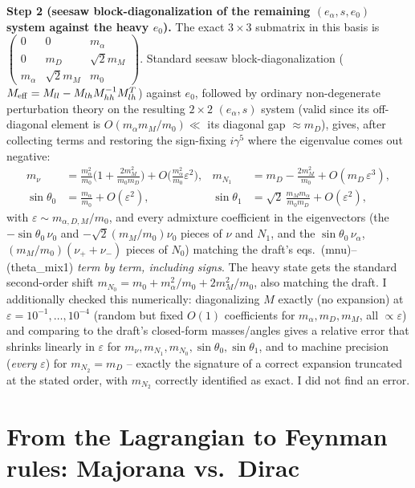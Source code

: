 \documentclass[11pt,a4paper]{article}
\begin{document}
\textbf{Step 2 (seesaw block-diagonalization of the remaining
$(e_\alpha,s,e_0)$ system against the heavy $e_0$).} The exact $3\times3$
submatrix in this basis is $\begin{pmatrix}0&0&m_\alpha\\0&m_D&\sqrt2
m_M\\m_\alpha&\sqrt2m_M&m_0\end{pmatrix}$. Standard seesaw
block-diagonalization ($M_{\rm eff}=M_{ll}-M_{lh}M_{hh}^{-1}M_{lh}^T$) against
$e_0$, followed by ordinary non-degenerate perturbation theory on the
resulting $2\times2$ $(e_\alpha,s)$ system (valid since its off-diagonal
element is $O(m_\alpha m_M/m_0)\ll$ its diagonal gap $\approx m_D$), gives,
after collecting terms and restoring the sign-fixing $i\gamma^5$ where the
eigenvalue comes out negative:
\begin{align}
  m_\nu &= \frac{m_\alpha^2}{m_0}\Big(1+\frac{2m_M^2}{m_0m_D}\Big)
    + O\Big(\frac{m_\alpha^2}{m_0}\varepsilon^2\Big), &
  m_{N_1} &= m_D - \frac{2m_M^2}{m_0} + O(m_D\,\varepsilon^3), \\
  \sin\theta_0 &= \frac{m_\alpha}{m_0}+O(\varepsilon^2), &
  \sin\theta_1 &= \sqrt2\,\frac{m_Mm_\alpha}{m_0m_D}+O(\varepsilon^2),
\end{align}
with $\varepsilon\sim m_{\alpha,D,M}/m_0$, and every admixture coefficient in
the eigenvectors (the $-\sin\theta_0\,\nu_0$ and $-\sqrt2(m_M/m_0)\nu_0$
pieces of $\nu$ and $N_1$, and the $\sin\theta_0\,\nu_\alpha$,
$(m_M/m_0)(\nu_++\nu_-)$ pieces of $N_0$) matching the draft's
eqs.~(mnu)--(theta\_mix1) \emph{term by term, including signs}. The heavy
state gets the standard second-order shift $m_{N_0}=m_0+m_\alpha^2/m_0+2m_M^2/m_0$,
also matching the draft. I additionally checked this numerically:
diagonalizing $M$ exactly (no expansion) at $\varepsilon=10^{-1},\ldots,10^{-4}$
(random but fixed $O(1)$ coefficients for $m_\alpha,m_D,m_M$, all $\propto\varepsilon$)
and comparing to the draft's closed-form masses/angles gives a relative
error that shrinks linearly in $\varepsilon$ for $m_\nu,m_{N_1},m_{N_0},\sin\theta_0,\sin\theta_1$,
and to machine precision (\emph{every} $\varepsilon$) for $m_{N_2}=m_D$ --
exactly the signature of a correct expansion truncated at the stated order,
with $m_{N_2}$ correctly identified as exact. I did not find an error.

\section{From the Lagrangian to Feynman rules: Majorana vs.\ Dirac}
\label{sec:majorana-vertex}
\end{document}
